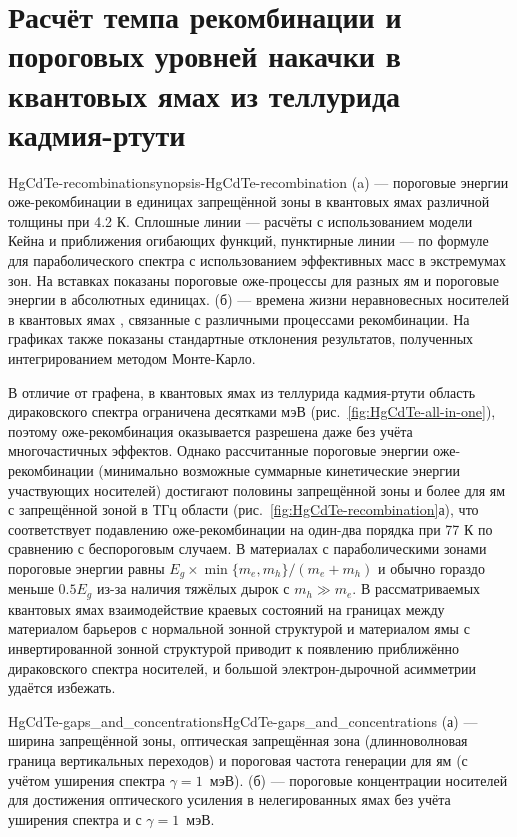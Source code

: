 \section{Расчёт темпа рекомбинации и пороговых уровней накачки в квантовых ямах из теллурида кадмия-ртути} \label{sec:HgCdTe-results}
\begin{fig}{HgCdTe-recombination}{synopsis-HgCdTe-recombination} (a) --- пороговые энергии оже-рекомбинации в единицах запрещённой зоны в квантовых ямах \HgCdTe{} различной толщины при 4.2 К. Сплошные линии --- расчёты с использованием модели Кейна и приближения огибающих функций, пунктирные линии --- по формуле для параболического спектра с использованием эффективных масс в экстремумах зон. На вставках показаны пороговые оже-процессы для разных ям и пороговые энергии в абсолютных единицах. (б) --- времена жизни неравновесных носителей в квантовых ямах \HgCdTe{}, связанные с различными процессами рекомбинации. На графиках также показаны стандартные отклонения результатов, полученных интегрированием методом Монте-Карло. 
\end{fig}

В отличие от графена, в квантовых ямах из теллурида кадмия-ртути область дираковского спектра ограничена десятками мэВ (рис.~\ref{fig:HgCdTe-all-in-one}), поэтому оже-рекомбинация оказывается разрешена даже без учёта многочастичных эффектов. Однако рассчитанные пороговые энергии оже-рекомбинации (минимально возможные суммарные кинетические энергии участвующих носителей) достигают половины запрещённой зоны и более для ям с запрещённой зоной в ТГц области (рис.~\ref{fig:HgCdTe-recombination}а), что соответствует подавлению оже-рекомбинации на один-два порядка при 77 К по сравнению с беспороговым случаем. В материалах с параболическими зонами пороговые энергии равны $E_g \times \min\{m_e, m_h\}/(m_e + m_h)$ и обычно гораздо меньше $0.5 E_g$ из-за наличия тяжёлых дырок с $m_h \gg m_e$. В рассматриваемых квантовых ямах взаимодействие краевых состояний на границах между материалом барьеров с нормальной зонной структурой и материалом ямы с инвертированной зонной структурой приводит к появлению приближённо дираковского спектра носителей, и большой электрон-дырочной асимметрии удаётся избежать.

\begin{fig}{HgCdTe-gaps_and_concentrations}{HgCdTe-gaps_and_concentrations} (а) --- ширина запрещённой зоны, оптическая запрещённая зона (длинноволновая граница вертикальных переходов) и пороговая частота генерации для ям \HgCdTe{} (с учётом уширения спектра $\gamma = 1$~мэВ). (б) --- пороговые концентрации носителей для достижения оптического усиления в нелегированных ямах без учёта уширения спектра и с $\gamma = 1$~мэВ.
\end{fig}

